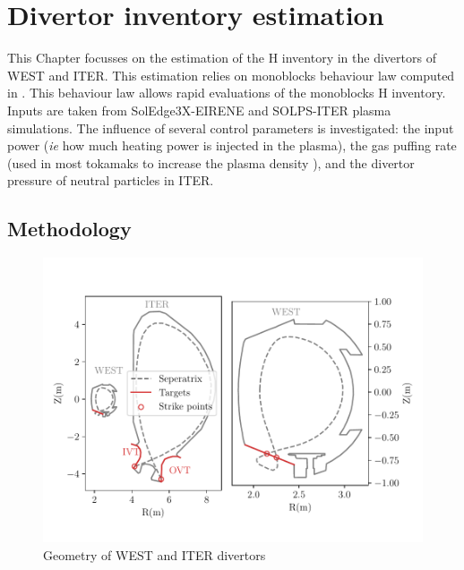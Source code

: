\setchapterpreamble[u]{\margintoc}
\chapter{Divertor inventory estimation}\label{Chapter4}


This Chapter focusses on the estimation of the H inventory in the divertors of WEST and ITER.
This estimation relies on monoblocks behaviour law computed in .
This behaviour law allows rapid evaluations of the monoblocks H inventory.
Inputs are taken from SolEdge3X-EIRENE \cite{bufferand_three-dimensional_2019} and SOLPS-ITER \cite{kaveeva_solps-iter_2020} plasma simulations.
The influence of several control parameters is investigated: the input power (\textit{ie} how much heating power is injected in the plasma), the gas puffing rate (used in most tokamaks to increase the plasma density \cite{zweben_effect_2014}), and the divertor pressure of neutral particles in ITER.


\section{Methodology}
\begin{figure}[h!]
    \centering
    \includegraphics[width=0.95\linewidth]{Figures/Chapter4/coordinates.pdf}
    \caption{Geometry of WEST and ITER divertors}
    \label{fig: reactors}
\end{figure}

